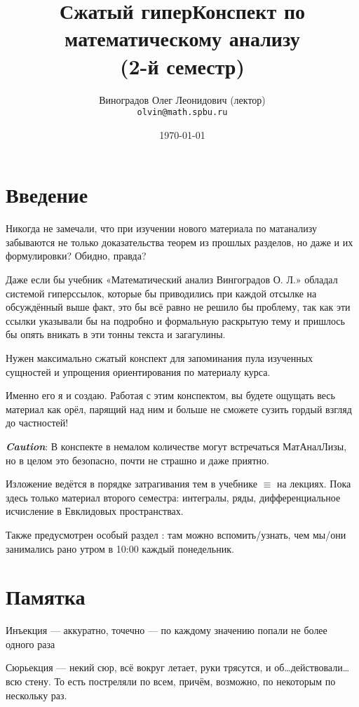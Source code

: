 \documentclass[12pt, a4paper]{article}
\title{Сжатый гиперКонспект по математическому анализу \\(2-й семестр)}
\author{
  \vova
  \and
  Виноградов Олег Леонидович (лектор)\\
  \texttt{olvin@math.spbu.ru}
}
\date{\today}
\begin{document}
  \maketitle
  \newpage
  \tableofcontents
  \newpage


  \section{Введение}

  Никогда не замечали, что при изучении нового материала по матанализу забываются не только доказательства теорем из прошлых разделов, но даже и их формулировки?
  Обидно, правда?

  Даже если бы учебник «Математический анализ Вингоградов О. Л.» обладал системой гиперссылок, которые бы приводились при каждой отсылке на обсуждённый выше факт, 
  это бы всё равно не решило бы проблему, так как эти ссылки указывали бы на подробно и формальную раскрытую тему и пришлось бы опять вникать в эти тонны текста и загагулины.

  Нужен максимально сжатый конспект для запоминания пула изученных сущностей и упрощения ориентирования по материалу курса.
  
  Именно его я и создаю.
  Работая с этим конспектом, вы будете ощущать весь материал как орёл, парящий над ним и больше не сможете сузить гордый взгляд до частностей!

  \textit{\textbf{Caution}}: В конспекте в немалом количестве могут встречаться МатАналЛизы, но в целом это безопасно, почти не страшно и даже приятно.

  Изложение ведётся в порядке затрагивания тем в учебнике $\equiv$ на лекциях.
  Пока здесь только материал второго семестра: интегралы, ряды, дифференциальное исчисление в Евклидовых пространствах.

  Также предусмотрен особый раздел : там можно вспомить/узнать, чем мы/они занимались рано утром в 10:00 каждый понедельник.


  \section{Памятка}

  Инъекция — аккуратно, точечно — по каждому значению попали не более одного раза
  
  Сюрьекция — некий сюр, всё вокруг летает, руки трясутся, и об…действовали… всю стену. 
  То есть постреляли по всем, причём, возможно, по некоторым по нескольку раз.
\end{document}
